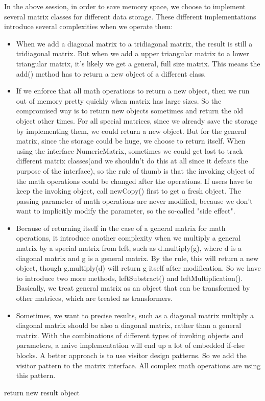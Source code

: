 In the above session, in order to save memory space, we choose to implement several matrix classes for different data storage. These different implementations introduce several complexities when we operate them:
\begin{itemize}
\item When we add a diagonal matrix to a tridiagonal matrix, the result is still a tridiagonal matrix. But when we add a upper triangular matrix to a lower triangular matrix, it's likely we get a general, full size matrix. This means the add() method has to return a new object of a different class.
\item If we enforce that all math operations to return a new object, then we run out of memory pretty quickly when matrix has large sizes. So the compromised way is to return new objects sometimes and return the old object other times. For all special matrices, since we already save the storage by implementing them, we could return a new object. But for the general matrix, since the storage could be huge, we choose to return itself. When using the interface NumericMatrix, sometimes we could get lost to track different matrix classes(and we shouldn't do this at all since it defeats the purpose of the interface), so the rule of thumb is that the invoking object of the math operations could be changed after the operations. If users have to keep the invoking object, call newCopy() first to get a fresh object. The passing parameter of math operations are never modified, because we don't want to implicitly modify the parameter, so the so-called "side effect".
\item Because of returning itself in the case of a general matrix for math operations, it introduce another complexity when we multiply a general matrix by a special matrix from left, such as d.multiply(g), where d is a diagonal matrix and g is a general matrix. By the rule, this will return a new object, though g.multiply(d) will return g itself after modification. So we have to introduce two more methods, leftSubstract() and leftMultiplication(). Basically, we treat general matrix as an object that can be transformed by other matrices, which are treated as transformers.
\item Sometimes, we want to precise results, such as a diagonal matrix multiply a diagonal matrix should be also a diagonal matrix, rather than a general matrix. With the combinations of different types of invoking objects and parameters, a naive implementation will end up a lot of embedded if-else blocks. A better approach is to use visitor design patterns. So we add the visitor pattern to the matrix interface. All complex math operations are using this pattern.
\end{itemize}
return new result object

